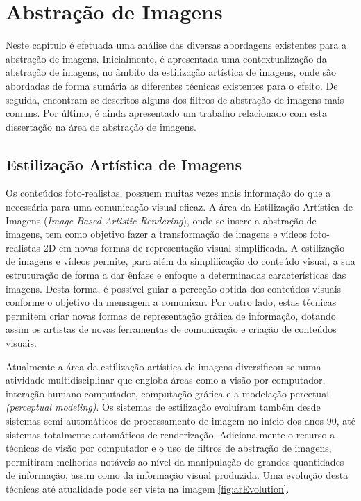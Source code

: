 \chapter{Abstração de Imagens} \label{chap:abstracao}

Neste capítulo é efetuada uma análise das diversas abordagens existentes para a abstração de imagens. Inicialmente, é apresentada uma contextualização da abstração de imagens, no âmbito da estilização artística de imagens, onde são abordadas de forma sumária as diferentes técnicas existentes para o efeito. De seguida, encontram-se descritos alguns dos filtros de abstração de imagens mais comuns. Por último, é ainda apresentado um trabalho relacionado com esta dissertação na área de abstração de imagens.

\section{Estilização Artística de Imagens}
Os conteúdos foto-realistas, possuem muitas vezes mais informação do que a necessária para uma comunicação visual eficaz. A área da Estilização Artística de Imagens (\textit{Image Based Artistic Rendering}), onde se insere a abstração de imagens,  tem como objetivo fazer a transformação de imagens e vídeos foto-realistas 2D em novas formas de representação visual simplificada. A estilização de imagens e vídeos permite, para além da simplificação do conteúdo visual, a sua estruturação de forma a dar ênfase e enfoque a determinadas características das imagens. Desta forma, é possível guiar a perceção obtida dos conteúdos visuais conforme o objetivo da mensagem a comunicar. Por outro lado, estas técnicas permitem criar novas formas de representação gráfica de informação, dotando assim os artistas de novas ferramentas de comunicação e criação de conteúdos visuais.

Atualmente a área da estilização artística de imagens diversificou-se numa atividade multidisciplinar que engloba áreas como a visão por computador, interação humano computador, computação gráfica e a modelação percetual \textit{(perceptual modeling)}. Os sistemas de estilização evoluíram também desde sistemas semi-automáticos de processamento de imagem no início dos anos 90, até sistemas totalmente automáticos de renderização. Adicionalmente o recurso a técnicas de visão por computador e o uso de filtros de abstração de imagens, permitiram melhorias notáveis ao nível da manipulação de grandes quantidades de informação, assim como da informação visual produzida. Uma evolução desta técnicas até atualidade pode ser vista na imagem \ref{fig:arEvolution}.

